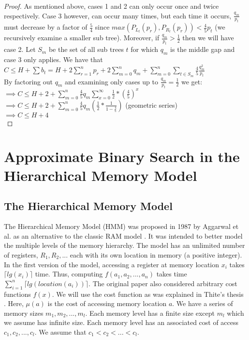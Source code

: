 \documentclass[letterpaper,12pt,titlepage,oneside,final]{book}
\theoremstyle{plain}
\begin{document}
\begin{proof}
As mentioned above, cases 1 and 2 can only occur once and twice respectively. Case 3 however, can occur many times, but each time it occurs, $\frac{q_m}{p_t}$ must decrease by a factor of $\frac{5}{4}$ since $max(P_{L_t}(p_r), P_{R_t}(p_r)) < \frac{4}{5} p_t$ (we recursively examine a smaller sub tree). Moreover, if $\frac{q_m}{p_t} > \frac{1}{2}$ then we will have case 2. Let $S_m$ be the set of all sub trees $t$ for which $q_m$ is the middle gap and case 3 only applies. We have that \\
$C \leq H + \sum b_t = H + 2 \sum\limits_{r = 1}^n p_r + 2 \sum\limits_{m = 0}^n q_m + \sum\limits_{m = 0}^n \sum\limits_{t \in S_m} \frac{4}{5}\frac{q_m^2}{p_t}$ \\ 
By factoring out $q_m$ and examining only cases up to $\frac{q_m}{p_t} = \frac{1}{2}$ we get: \\
$\implies C \leq H + 2 + \sum\limits_{m = 0}^n \frac{4}{5} q_m \sum\limits_{x=0}^{\infty} \frac{1}{2} * (\frac{4}{5}) ^ x$ \\
$\implies C \leq H + 2 + \sum\limits_{m = 0}^n \frac{4}{5}q_m (\frac{1}{2} * \frac{1}{1-\frac{4}{5}})$ (geometric series) \\
$\implies C \leq H + 4$ \\

\end{proof}

\chapter{Approximate Binary Search in the Hierarchical Memory Model}\label{Approximate Binary Search in the Hierarchical Memory Model}
 
\section{The Hierarchical Memory Model}\label{The Hierarchical Memory Model}

The Hierarchical Memory Model (HMM) was proposed in 1987 by Aggarwal et al. as an alternative to the classic RAM model \cite{aggarwal1987model}. It was intended to better model the multiple levels of the memory hierarchy. The model has an unlimited number of registers, $R_1, R_2, ...$ each with its own location in memory (a positive integer). In the first version of the model, accessing a register at memory location $x_i$ takes $\lceil lg(x_i) \rceil$ time. Thus, computing $f(a_1, a_2, ..., a_n)$ takes time $\sum_{i=1}^{n} \lceil lg(location(a_i)) \rceil$. The original paper also considered arbitrary cost functions $f(x)$. We will use the cost function as was explained in Thite's thesis \cite{thite2008optimum}. Here, $\mu (a)$ is the cost of accessing memory location $a$. We have a series of memory sizes $m_1, m_2, ..., m_l$. Each memory level has a finite size except $m_l$ which we assume has infinite size. Each memory level has an associated cost of access $c_1, c_2, ..., c_l$. We assume that $c_1 < c_2 < ... < c_l$. 
\end{document}
